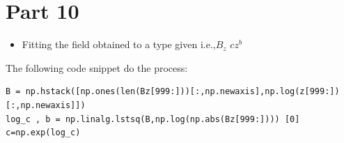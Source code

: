 \documentclass[11pt, a4paper]{article}
\begin{document}
\section*{Part 10}
\begin{itemize}
\item Fitting the field obtained to a type given i.e.,$B_z$ \approx  $cz^b$
\end{itemize}
The following code snippet do the process:
\begin{verbatim}	
B = np.hstack([np.ones(len(Bz[999:]))[:,np.newaxis],np.log(z[999:])[:,np.newaxis]])
log_c , b = np.linalg.lstsq(B,np.log(np.abs(Bz[999:]))) [0]
c=np.exp(log_c)
\end{verbatim}
 
\end{document}
